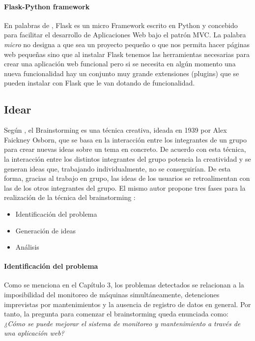 \paragraph{Flask-Python framework} En palabras de \cite{munoz2017}, Flask es un micro Framework escrito en Python y concebido para facilitar el desarrollo de Aplicaciones Web bajo el patrón MVC. La palabra \textit{micro} no designa a que sea un proyecto pequeño o que nos permita hacer páginas web pequeñas sino que al instalar Flask tenemos las herramientas necesarias para crear una aplicación web funcional pero si se necesita en algún momento una nueva funcionalidad hay un conjunto muy grande extensiones (plugins) que se pueden instalar con Flask que le van dotando de funcionalidad. 

\subsection{Idear}

Según \parencite{leis2020}, el Brainstorming es una técnica creativa, ideada en 1939 por Alex Faickney Osborn, que se basa en la interacción entre los integrantes de un grupo para crear nuevas ideas sobre un tema en concreto. De acuerdo con esta técnica, la interacción entre los distintos integrantes del grupo potencia la creatividad y se generan ideas que, trabajando individualmente, no se conseguirían. De esta forma, gracias al trabajo en grupo, las ideas de los usuarios se retroalimentan con las de los otros integrantes del grupo.
El mismo autor propone tres fases para la realización de la técnica del brainstorming \parencite{leis2020}:

\begin{itemize}
\item Identificación del problema
\item Generación de ideas
\item Análisis
\end{itemize}

\paragraph{Identificación del problema} Como se menciona en el Capítulo 3, los problemas detectados se relacionan a la imposibilidad del monitoreo de máquinas simultáneamente, detenciones imprevistas por mantenimientos y la ausencia de registro de datos en general. Por tanto, la pregunta para comenzar el brainstorming queda enunciada como: \textit{¿Cómo se puede mejorar el sistema de monitoreo y mantenimiento a través de una aplicación web?}

